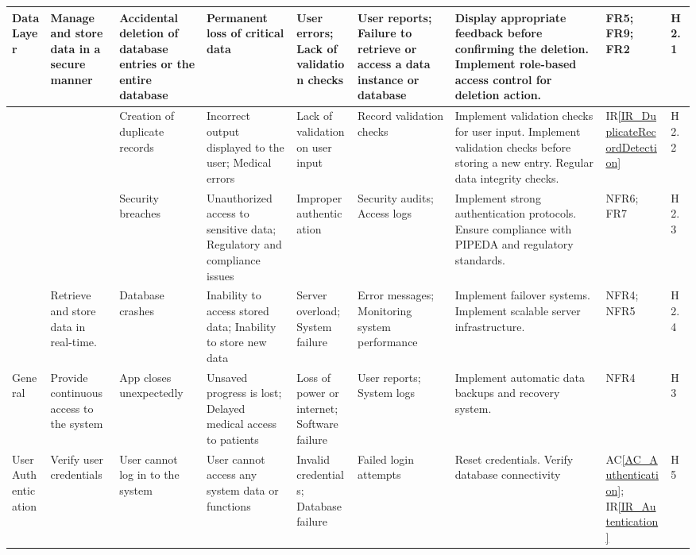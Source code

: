 \documentclass{article}
\begin{document}
\begin{landscape}
\begin{longtable}{|p{1.5cm}|p{2cm}|p{2.6cm}|p{2cm}|p{2cm}|p{2cm}|p{3.5cm}|p{1cm}|p{0.8cm}|}
        \midrule
        Data Layer & \raggedright Manage and store data in a secure manner & \raggedright Accidental deletion of database entries or the entire database & \raggedright Permanent loss of critical data & \raggedright User errors; Lack of validation checks & \raggedright User reports; Failure to retrieve or access a data instance or database & \raggedright Display appropriate feedback before confirming the deletion. Implement role-based access control for deletion action. & FR5; FR9; FR2 & H2.1 \\ 
        \midrule
        & & \raggedright Creation of duplicate records & \raggedright Incorrect output displayed to the user; Medical errors & \raggedright Lack of validation on user input & \raggedright Record validation checks & \raggedright Implement validation checks for user input. Implement validation checks before storing a new entry. Regular data integrity checks. & IR\ref{IR_DuplicateRecordDetection} & H2.2 \\ 
        \midrule
        & & \raggedright Security breaches & \raggedright Unauthorized access to sensitive data; Regulatory and compliance issues & \raggedright Improper authentication & \raggedright Security audits; Access logs & \raggedright Implement strong authentication protocols. Ensure compliance with PIPEDA and regulatory standards. & NFR6; FR7 & H2.3 \\ 
        \midrule
        & \raggedright Retrieve and store data in real-time. & \raggedright Database crashes & \raggedright Inability to access stored data; Inability to store new data & \raggedright Server overload; System failure & \raggedright Error messages; Monitoring system performance & \raggedright Implement failover systems. Implement scalable server infrastructure. & NFR4; NFR5 & H2.4 \\ 
        \midrule
        General & \raggedright Provide continuous access to the system & \raggedright App closes unexpectedly & \raggedright Unsaved progress is lost; Delayed medical access to patients & \raggedright Loss of power or internet; Software failure & \raggedright User reports; System logs & \raggedright Implement automatic data backups and recovery system. & NFR4 & H3 \\
        \midrule
        User Authentication & \raggedright Verify user credentials & \raggedright User cannot log in to the system & \raggedright User cannot access any system data or functions & \raggedright Invalid credentials; Database failure & \raggedright Failed login attempts & \raggedright Reset credentials. Verify database connectivity & AC\ref{AC_Authentication}; IR\ref{IR_Autentication} & H5 \\

\end{longtable}
\end{landscape}
\end{document}
